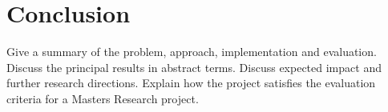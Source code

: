 \chapter{Conclusion}\label{chap:conclusion}
Give a summary of the problem, approach, implementation and evaluation. Discuss the principal
results in abstract terms. Discuss expected impact and further research directions.
Explain how the project satisfies the evaluation criteria for a Masters Research project. 